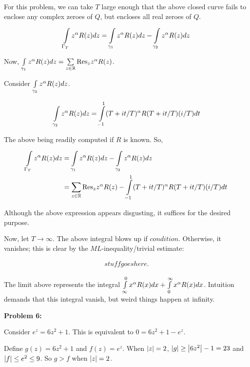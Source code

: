 \documentclass[a4paper,12pt]{article}
\begin{document}
\shunt %

For this problem, we can take $T$ large enough that the above closed curve fails to enclose any complex zeroes of $Q$, but encloses all real zeroes of $Q$.

\begin{align*}
\int\limits_{\Gamma_T} z^\alpha R(z) dz &= \int\limits_{\gamma_1} z^\alpha R(z) dz - \int\limits_{\gamma_2} z^\alpha R(z) dz\\
\end{align*} %

Now, $\int\limits_{\gamma_1} z^\alpha R(z) dz =\sum\limits_{z \in \mathbb{R}} \text{Res}_z z^\alpha R(z)$.

Consider $\int\limits_{\gamma_2} z^\alpha R(z) dz$.

\begin{align*}
\int\limits_{\gamma_2} z^\alpha R(z) dz &= \int\limits_{-1}^1 (T+it/T)^\alpha R(T+it/T) (i/T) dt\\
\end{align*}

The above being readily computed if $R$ is known. So,

\begin{align*}
\int\limits_{\Gamma_T} z^\alpha R(z) dz &= \int\limits_{\gamma_1} z^\alpha R(z) dz - \int\limits_{\gamma_2} z^\alpha R(z) dz\\
&= \sum\limits_{z \in \mathbb{R}} \text{Res}_z z^\alpha R(z)-\int\limits_{-1}^1 (T+it/T)^\alpha R(T+it/T) (i/T) dt
\end{align*}

Although the above expression appears disgusting, it suffices for the desired purpose.

Now, let $T \to \infty$. The above integral blows up if $condition$. Otherwise, it vanishes; this is clear by the $ML$-inequality/trivial estimate:

\begin{align*}
stuffgoeshere.
\end{align*}

The limit above represents the integral $\int\limits_{\infty}^0 x^\alpha R(x) dx + \int\limits_{0}^\infty x^\alpha R(x) dx$. Intuition demands that this integral vanish, but weird things happen at infinity.

\shunt

{\bf Problem 6:}

Consider $e^z = 6z^2 + 1$. This is equivalent to $0=6z^2 + 1 -e^z$.

Define $g(z) = 6z^2 +1$ and $f(z) = e^z$. When $\left\lvert z \right\rvert = 2$, $\left\lvert g \right\rvert \geq \left\lvert 6z^2 \right\rvert -1 = 23$ and $\left\lvert f \right\rvert \leq e^2 \leq 9$. So $g>f$ when $\left\lvert z \right\rvert = 2$.
\end{document}
